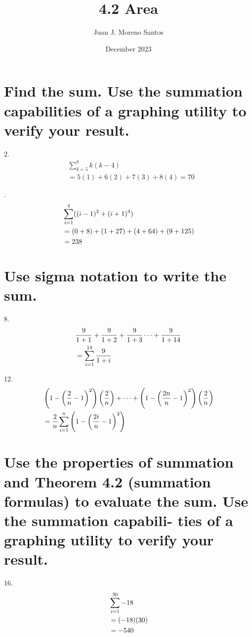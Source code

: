 \documentclass[11pt]{article}
\newcommand*{\vs}{\vspace{1cm}}
\newcommand*{\next}{\noindent}
\newcommand*{\set}{\setcounter{equation}{0}}
\begin{document}
\title{4.2 Area}
\author{Juan J. Moreno Santos}
\date{December 2023}

\maketitle

\section{Find the sum. Use the summation capabilities of a graphing utility to verify your result.}
2.\begin{align}
    &\sum_{k=5}^{8}k(k-4)\\
    &=5(1)+6(2)+7(3)+8(4)=70
\end{align}

\vs\next
6.\begin{align}
    \set
    &\sum_{i=1}^{4}((i-1)^2+(i+1)^3)\\
    &=(0+8)+(1+27)+(4+64)+(9+125)\\
    &=238\\
\end{align}

\section{Use sigma notation to write the sum.}
8.\begin{align}
    \set
    &\frac{9}{1+1}+\frac{9}{1+2}+\frac{9}{1+3}\cdots+\frac{9}{1+14}\\
    &=\sum_{i=1}^{14}\frac{9}{1+i}
\end{align}

12.\begin{align}
    \set
    &\left(1-\left(\frac{2}{n}-1\right)^2\right)\left(\frac{2}{n}\right)+\cdots+\left(1-\left(\frac{2n}{n}-1\right)^2\right)\left(\frac{2}{n}\right)\\
    &=\frac{2}{n}\sum_{i=1}^{n}\left(1-\left(\frac{2i}{n}-1\right)^2\right)
\end{align}

\section{Use the properties of summation and
Theorem 4.2 (summation formulas) to evaluate the sum. Use the summation capabili-
ties of a graphing utility to verify your result.}

16.\begin{align}
    \set
    &\sum_{i=1}^{30}-18\\
    &=(-18)(30)\\
    &=-540
\end{align}
\end{document}
